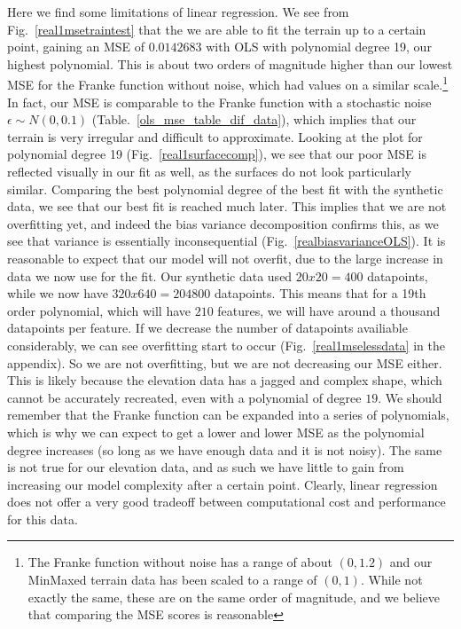 \documentclass[twocolumn,10pt,cleanfoot]{asme2ej}
\begin{document}
Here we find some limitations of linear regression. We see from Fig.~\ref{real1msetraintest} that the we are able to fit the terrain up to a certain point, gaining an MSE of $0.0142683$ with OLS with polynomial degree 19, our highest polynomial. This is about two orders of magnitude higher than our lowest MSE for the Franke function without noise, which had values on a similar scale.\footnote{The Franke function without noise has a range of about $(0,1.2)$ and our MinMaxed terrain data has been scaled to a range of $(0,1)$. While not exactly the same, these are on the same order of magnitude, and we believe that comparing the MSE scores is reasonable} In fact, our MSE is comparable to the Franke function with a stochastic noise $\epsilon \sim N(0,0.1)$ (Table.~\ref{ols_mse_table_dif_data}), which implies that our terrain is very irregular and difficult to approximate. Looking at the plot for polynomial degree 19 (Fig.~\ref{real1surfacecomp}), we see that our poor MSE is reflected visually in our fit as well, as the surfaces do not look particularly similar. Comparing the best polynomial degree of the best fit with the synthetic data, we see that our best fit is reached much later. This implies that we are not overfitting yet, and indeed the bias variance decomposition confirms this, as we see that variance is essentially inconsequential (Fig.~\ref{realbiasvarianceOLS}). %
It is reasonable to expect that our model will not overfit, due to the large increase in data we now use for the fit. Our synthetic data used $20 x 20 = 400$ datapoints, while we now have $320 x 640 = 204 800$ datapoints. This means that for a 19th order polynomial, which will have $210$ features, we will have around a thousand datapoints per feature. If we decrease the number of datapoints availiable considerably, we can see overfitting start to occur (Fig.~\ref{real1mselessdata} in the appendix). So we are not overfitting, but we are not decreasing our MSE either. This is likely because the elevation data has a jagged and complex shape, which cannot be accurately recreated, even with a polynomial of degree $19$. We should remember that the Franke function can be expanded into a series of polynomials, which is why we can expect to get a lower and lower MSE as the polynomial degree increases (so long as we have enough data and it is not noisy). The same is not true for our elevation data, and as such we have little to gain from increasing our model complexity after a certain point. Clearly, linear regression does not offer a very good tradeoff between computational cost and performance for this data.
\end{document}
